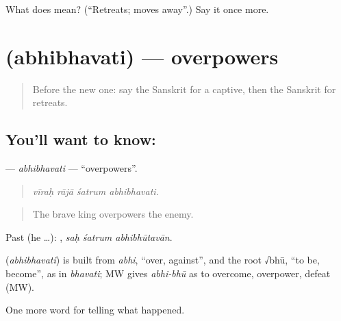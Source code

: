\begin{tcolorbox}[breakable,colback=teal!4,colframe=teal!35!black,title={Before you move on}]
What does  mean? (\textquotedblleft{}Retreats; moves away\textquotedblright{}.) Say it once more.
\end{tcolorbox}
\section[\texorpdfstring{\sk{अभिभवति} (abhibhavati)}{अभिभवति (abhibhavati)}]{ (abhibhavati) — overpowers}

\label{lesson:SA-C319-abhibhavati}



\begin{quote}
Before the new one: say the Sanskrit for a captive, then the Sanskrit for retreats.
\end{quote}

\subsection*{You'll want to know: }
\textbf{} — \emph{abhibhavati} — \textquotedblleft{}overpowers\textquotedblright{}.

\begin{quote}
   
\end{quote}

\begin{quote}
\emph{vīraḥ rājā śatrum abhibhavati.}
\end{quote}

\begin{quote}
The brave king overpowers the enemy.
\end{quote}

Past (he …):   , \emph{saḥ śatrum abhibhūtavān}.

\begin{cousinweb}
\textbf{} (\emph{abhibhavati}) is built from \emph{abhi}, \textquotedblleft{}over, against\textquotedblright{}, and the root √bhū, \textquotedblleft{}to be, become\textquotedblright{}, as in \emph{bhavati}; MW gives \emph{abhi-bhū} as to overcome, overpower, defeat (MW).
\end{cousinweb}

\begin{grammarlens}[title={What you've built}]
One more word for telling what happened.
\end{grammarlens}


